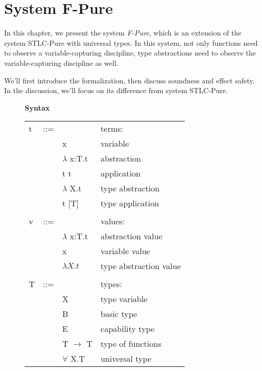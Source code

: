 \section{System F-Pure}

In this chapter, we present the system \emph{F-Pure}, which is an
extension of the system STLC-Pure with universal types. In this
system, not only functions need to observe a variable-capturing
discipline, type abstractions need to observe the variable-capturing
discipline as well.

We'll first introduce the formalization, then discuss soundness and
effect safety. In the discussion, we'll focus on its difference from
system STLC-Pure.

\begin{figure}
\begin{framed}

\setlength{\columnseprule}{0.4pt}
\begin{multicols}{2}

\textbf{Syntax}

\begin{tabu} to \linewidth {l l l X[r]}
  t   & ::= &                                      & terms:               \\
      &     &  x                                   & variable             \\
      &     & $\lambda$ x:T.t                      & abstraction          \\
      &     & t t                                  & application          \\
      &     & \colorbox{shade}{$\lambda$ X.t}      & type abstraction     \\
      &     & \colorbox{shade}{t [T]}              & type application     \\
\\
  v   & ::= &                    & values:              \\
      &     & $\lambda$ x:T.t    & abstraction value    \\
      &     & x                  & variable value       \\
      &     & \colorbox{shade}{$\lambda X.t$}    & type abstraction value  \\
\\
  T   & ::= &                       & types:               \\
      &     & \colorbox{shade}{X}   & type variable        \\
      &     & B                     & basic type           \\
      &     & E                     & capability type      \\
      &     & T $\to$ T             & type of functions    \\
      &     & \colorbox{shade}{$\forall$ X.T} & universal type       \\
\end{tabu}


\end{multicols}
\end{framed}
\end{figure}
